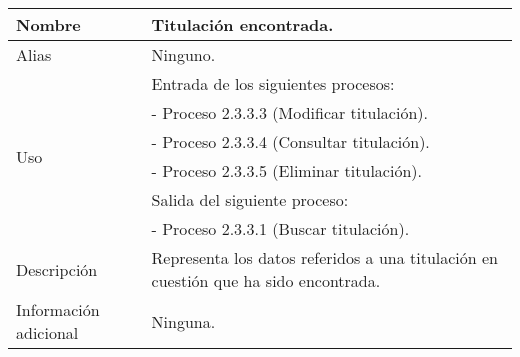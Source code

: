 \begin{center}
  \begin{tabular}{| l | p{9cm} |}
    \hline
    Nombre & \textbf{Titulación encontrada}.\\
    \hline
    Alias & Ninguno.\\
    \hline
    \multirow{6}{*}{Uso} & Entrada de los siguientes procesos:\\
                         & - Proceso 2.3.3.3 (Modificar titulación).\\
                         & - Proceso 2.3.3.4 (Consultar titulación).\\
                         & - Proceso 2.3.3.5 (Eliminar titulación).\\
                         & Salida del siguiente proceso:\\
                         & - Proceso 2.3.3.1 (Buscar titulación).\\
    \hline
    Descripción & Representa los datos referidos a una titulación en cuestión
                  que ha sido encontrada.\\
    \hline
    Información adicional & Ninguna.\\
    \hline
  \end{tabular}
\end{center}
